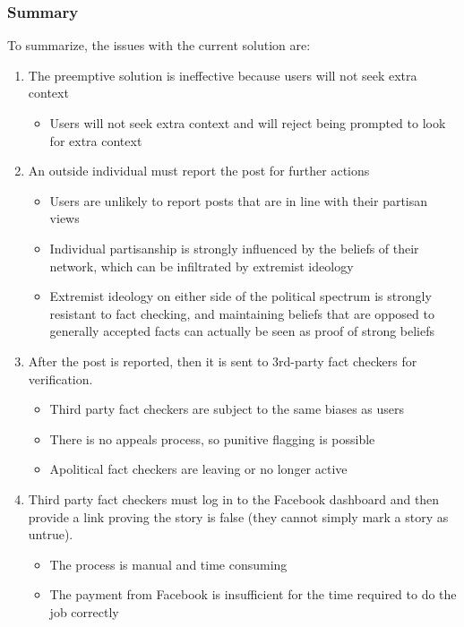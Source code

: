\documentclass[preprint,review,12pt]{elsarticle}
\begin{document}
\subsubsection{Summary}
\label{sec: summary with issues with current solutions}
To summarize, the issues with the current solution are:
\renewcommand{\labelenumii}{\Roman{enumii}}
\begin{enumerate}
\item The preemptive solution is ineffective because users will not seek extra context
\begin{itemize}
\item Users will not seek extra context and will reject being prompted to look for extra context
\end{itemize}
\item An outside individual must report the post for further actions
 \begin{itemize}
     \item Users are unlikely to report posts that are in line with their partisan views
     \item Individual partisanship is strongly influenced by the beliefs of their network, which can be infiltrated by extremist ideology
     \item Extremist ideology on either side of the political spectrum is strongly resistant to fact checking, and maintaining beliefs that are opposed to generally accepted facts can actually be seen as proof of strong beliefs
    \end{itemize}
     \item After the post is reported, then it is  sent to 3rd-party fact checkers for verification. 
     \begin{itemize}
         \item Third party fact checkers are subject to the same biases as users
         \item There is no appeals process, so punitive flagging is possible
         \item Apolitical fact checkers are leaving or no longer active
     \end{itemize}
     \item Third party fact checkers must log in to the Facebook dashboard and then provide a link proving the story is false (they cannot simply mark a story as untrue).
     \begin{itemize}
         \item The process is manual and time consuming
         \item The payment from Facebook is insufficient for the time required to do the job correctly

\end{itemize}
\end{enumerate}
\end{document}
